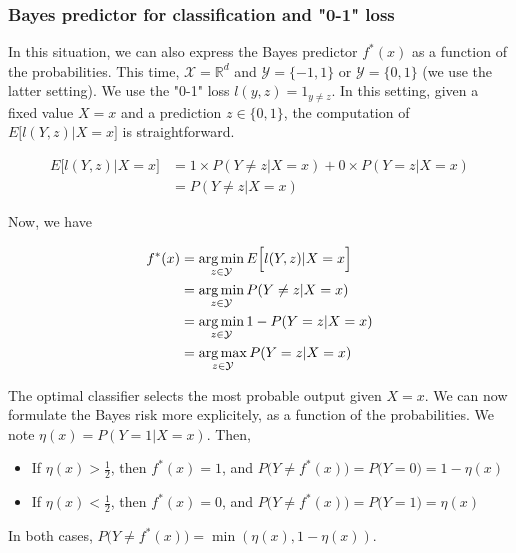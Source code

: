 \documentclass[
10pt, %
a4paper, %
oneside, %
headinclude,footinclude, %
BCOR5mm, %
]{scrartcl}
\begin{document}
\subsubsection{\large\color{Periwinkle}Bayes predictor for classification and "0-1" loss}

In this situation, we can also express the Bayes predictor $f^*(x)$ as a
function of the probabilities. This time, $ \mathcal{X} = \mathbb{R}^d$ and $
\mathcal{Y}  = \{-1, 1\}$ or $ \mathcal{Y}  = \{0, 1\}$ (we use the latter
setting). We use the "0-1" loss $l(y,z) = 1_{y\neq z}$. In this setting, given a fixed value $X=x$ and a prediction $z\in \{0, 1\}$,
the computation of $E\Big[l(Y,z)|X=x\Big]$ is
straightforward.

\begin{equation}
    \begin{aligned}
        \label{eq:}
        E\Big[l(Y,z)|X=x\Big] &= 1 \times P(Y\neq z|X=x)+0\times P(Y=z|X=x)\\
        &=  P(Y\neq z|X=x)
    \end{aligned}
\end{equation}


Now, we have

    \begin{equation}
        \begin{aligned}
            \label{eq:}
	    f^*(x)&= \operatorname*{arg\,min}_{z\in \mathcal{Y} }E\Big[l(Y,z)|X=x\Big]\\
	    &= \operatorname*{arg\,min}_{z\in \mathcal{Y} }P(Y\neq z|X=x)\\
	    &= \operatorname*{arg\,min}_{z\in \mathcal{Y} }1-P(Y=z|X=x)\\
	    &= \operatorname*{arg\,max}_{z\in \mathcal{Y} }P(Y=z|X=x)
        \end{aligned}
    \end{equation}

    The optimal classifier selects the most probable output given $X=x$. We can
    now formulate the Bayes risk more explicitely, as a function of the
    probabilities. We note $\eta(x) = P(Y=1|X=x)$. Then, 
    \begin{itemize}
        \item If $ \eta(x)> \frac{1}{2} $, then $f^*(x)=1$, and $P\big( Y\neq f^*(x)\big) =   P\big( Y=0\big)=1-\eta(x)$
	\item If $ \eta(x)< \frac{1}{2} $, then $f^*(x)=0$, and $P\big( Y\neq f^*(x)\big) =   P\big( Y=1\big)=\eta(x)$
    \end{itemize}

    In both cases, $P\big( Y\neq f^*(x)\big)= \min(\eta(x), 1-\eta(x))$.
    \\
\end{document}
